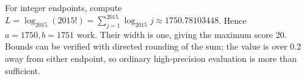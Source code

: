 For integer endpoints, compute $L=\log_{2015}(2015!)=\sum_{j=1}^{2015}\log_{2015}j\approx1750.78103448$. Hence $\boxed{a=1750,b=1751}$ work. Their width is one, giving the maximum score 20. Bounds can be verified with directed rounding of the sum; the value is over 0.2 away from either endpoint, so ordinary high-precision evaluation is more than sufficient.
